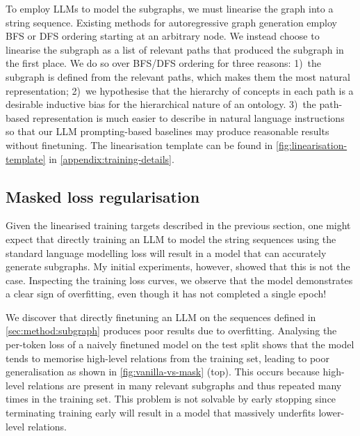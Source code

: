 To employ LLMs to model the subgraphs, we must linearise the graph into a string sequence. Existing methods for autoregressive graph generation employ BFS \cite{you2018graphrnn} or DFS \cite{goyal2020graphgen} ordering starting at an arbitrary node. We instead choose to linearise the subgraph as a list of relevant paths that produced the subgraph in the first place. We do so over BFS/DFS ordering for three reasons: 1)~the subgraph is defined from the relevant paths, which makes them the most natural representation; 2)~we hypothesise that the hierarchy of concepts in each path is a desirable inductive bias for the hierarchical nature of an ontology. 3)~the path-based representation is much easier to describe in natural language instructions so that our LLM prompting-based baselines may produce reasonable results without finetuning. The linearisation template can be found in \cref{fig:linearisation-template} in \cref{appendix:training-details}.

\subsection{Masked loss regularisation}



Given the linearised training targets described in the previous section, one might expect that directly training an LLM to model the string sequences using the standard language modelling loss will result in a model that can accurately generate subgraphs. My initial experiments, however, showed that this is not the case. Inspecting the training loss curves, we observe that the model demonstrates a clear sign of overfitting, even though it has not completed a single epoch!


We discover that directly finetuning an LLM on the sequences defined in \cref{sec:method:subgraph} produces poor results due to overfitting. Analysing the per-token loss of a naively finetuned model on the test split shows that the model tends to memorise high-level relations from the training set, leading to poor generalisation as shown in \cref{fig:vanilla-vs-mask} (top). This occurs because high-level relations are present in many relevant subgraphs and thus repeated many times in the training set. This problem is not solvable by early stopping since terminating training early will result in a model that massively underfits lower-level relations.

